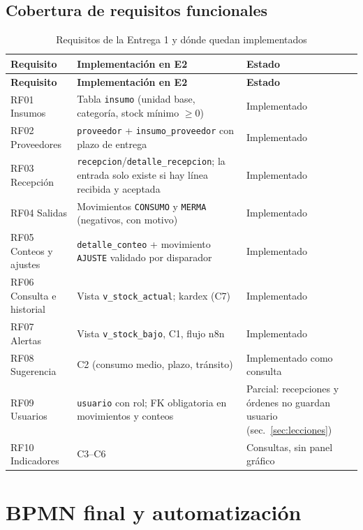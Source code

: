 \documentclass[11pt,letterpaper]{article}
\newcommand{\tablasize}{\footnotesize}
\begin{document}
\subsection*{Cobertura de requisitos funcionales}
{\tablasize
\begin{longtable}{>{\raggedright\arraybackslash}p{3.6cm}>{\raggedright\arraybackslash}p{7.4cm}>{\raggedright\arraybackslash}p{3.6cm}}
\caption{Requisitos de la Entrega 1 y dónde quedan implementados}\label{tab:rf}\\
\toprule \textbf{Requisito} & \textbf{Implementación en E2} & \textbf{Estado} \\ \midrule \endfirsthead
\toprule \textbf{Requisito} & \textbf{Implementación en E2} & \textbf{Estado} \\ \midrule \endhead
RF01 Insumos & Tabla \texttt{insumo} (unidad base, categoría, stock mínimo $\geq 0$) & Implementado \\
RF02 Proveedores & \texttt{proveedor} + \texttt{insumo\_proveedor} con plazo de entrega & Implementado \\
RF03 Recepción & \texttt{recepcion}/\texttt{detalle\_recepcion}; la entrada solo existe si hay línea recibida y aceptada & Implementado \\
RF04 Salidas & Movimientos \texttt{CONSUMO} y \texttt{MERMA} (negativos, con motivo) & Implementado \\
RF05 Conteos y ajustes & \texttt{detalle\_conteo} + movimiento \texttt{AJUSTE} validado por disparador & Implementado \\
RF06 Consulta e historial & Vista \texttt{v\_stock\_actual}; kardex (C7) & Implementado \\
RF07 Alertas & Vista \texttt{v\_stock\_bajo}, C1, flujo n8n & Implementado \\
RF08 Sugerencia & C2 (consumo medio, plazo, tránsito) & Implementado como consulta \\
RF09 Usuarios & \texttt{usuario} con rol; FK obligatoria en movimientos y conteos & Parcial: recepciones y órdenes no guardan usuario (sec.~\ref{sec:lecciones}) \\
RF10 Indicadores & C3--C6 & Consultas, sin panel gráfico \\
\bottomrule
\end{longtable}
}

\newpage
\section{BPMN final y automatización}
\label{sec:bpmn}
\end{document}
